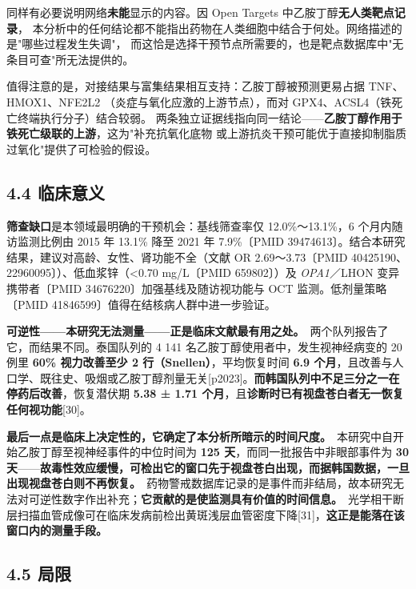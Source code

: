 \documentclass[UTF8,fontset=windows,11pt]{ctexart}
\begin{document}
同样有必要说明网络\textbf{未能}显示的内容。因 Open Targets 中乙胺丁醇\textbf{无人类靶点记录}， 本分析中的任何结论都不能指出药物在人类细胞中结合于何处。网络描述的是"哪些过程发生失调"， 而这恰是选择干预节点所需要的，也是靶点数据库中"无条目可查"所无法提供的。

值得注意的是，对接结果与富集结果相互支持：乙胺丁醇被预测更易占据 TNF、HMOX1、NFE2L2 （炎症与氧化应激的上游节点），而对 GPX4、ACSL4（铁死亡终端执行分子）结合较弱。 两条独立证据线指向同一结论——\textbf{乙胺丁醇作用于铁死亡级联的上游}，这为"补充抗氧化底物 或上游抗炎干预可能优于直接抑制脂质过氧化"提供了可检验的假设。

\subsection{4.4 临床意义}

\textbf{筛查缺口}是本领域最明确的干预机会：基线筛查率仅 12.0\%～13.1\%，6 个月内随访监测比例由 2015 年 13.1\% 降至 2021 年 7.9\%〔PMID 39474613〕。结合本研究结果，建议对高龄、女性、肾功能不全（文献 OR 2.69～3.73〔PMID 40425190、22960095〕）、低血浆锌（<0.70 mg/L〔PMID 659802〕）及 \textit{OPA1}／LHON 变异携带者〔PMID 34676220〕加强基线及随访视功能与 OCT 监测。低剂量策略〔PMID 41846599〕值得在结核病人群中进一步验证。

\textbf{可逆性——本研究无法测量——正是临床文献最有用之处。}\ 两个队列报告了它，而结果不同。泰国队列的 4 141 名乙胺丁醇使用者中，发生视神经病变的 20 例里 \textbf{60\% 视力改善至少 2 行（Snellen）}，平均恢复时间 \textbf{6.9 个月}，且改善与人口学、既往史、吸烟或乙胺丁醇剂量无关[p2023]。\textbf{而韩国队列中不足三分之一在停药后改善}，恢复潜伏期 \textbf{5.38 ± 1.71 个月}，且\textbf{诊断时已有视盘苍白者无一恢复任何视功能}[30]。

\textbf{最后一点是临床上决定性的，它确定了本分析所暗示的时间尺度。}\ 本研究中自开始乙胺丁醇至视神经事件的中位时间为 \textbf{125 天}，而同一批报告中非眼部事件为 \textbf{30 天}——\textbf{故毒性效应缓慢，可检出它的窗口先于视盘苍白出现，而据韩国数据，一旦出现视盘苍白则不再恢复。}\ 药物警戒数据库记录的是事件而非结局，故本研究无法对可逆性数字作出补充；\textbf{它贡献的是使监测具有价值的时间信息。}\ 光学相干断层扫描血管成像可在临床发病前检出黄斑浅层血管密度下降[31]，\textbf{这正是能落在该窗口内的测量手段。}

\subsection{4.5 局限}
\end{document}
